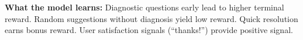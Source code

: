 \begin{chapterenv}
\textbf{What the model learns:} Diagnostic questions early lead to higher terminal reward. Random suggestions without diagnosis yield low reward. Quick resolution earns bonus reward. User satisfaction signals (``thanks!'') provide positive signal.

\end{chapterenv}
